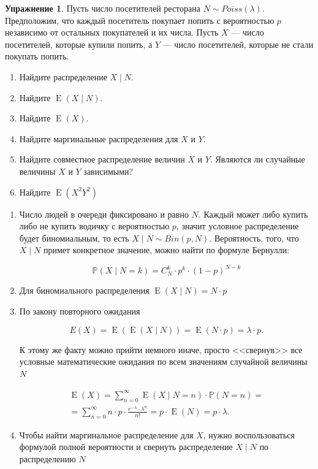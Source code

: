 \documentclass[12pt, a4paper, oneside]{extreport}
\DeclareMathOperator{\E}{\mathop{E}}
\def \mbb{\mathbb}
\def \PP{\mbb{P}}
\theoremstyle{plain}              %
\theoremstyle{definition}         %
\newtheorem{problem}{\color{myblue} Упражнение}
\begin{document}
\begin{problem}
Пусть число посетителей ресторана $N \sim Poiss(\lambda)$.  Предположим, что каждый посетитель покупает попить с вероятностью $p$ независимо от остальных покупателей и их числа. Пусть $X$ --- число посетителей, которые купили попить, а $Y$ --- число посетителей, которые не стали покупать попить.  

\begin{enumerate} 
\item Найдите распределение $X \mid N$.
\item Найдите $\E(X \mid N)$.
\item Найдите $\E(X)$.
\item Найдите маргинальные распределения для $X$ и $Y$.
\item Найдите совместное распределение величин $X$ и $Y$. Являются ли случайные величины $X$ и $Y$ зависимыми? 
\item Найдите $\E(X^2Y^2)$
\end{enumerate} 	

\begin{sol} 
\begin{enumerate}
	\item  Число людей в очереди фиксировано и равно $N$. Каждый может либо купить либо не купить водичку с вероятностью $p$, значит условное распределение будет биномиальным, то есть $X \mid N \sim Bin(p, N)$. Вероятность, того, что $X \mid N$ примет конкретное значение, можно найти по формуле Бернулли: 
	
	\[ \PP(X \mid N = k) = C_{N}^k \cdot p^k \cdot (1-p)^{N-k} \] 
	
	\item  Для биномиального распределения $\E(X \mid N) = N \cdot p$ 
	\item  По закону повторного ожидания 
	
	\[ E(X) = \E(\E(X \mid N)) = \E(N \cdot p) = \lambda \cdot p. \]
	
	К этому же факту можно прийти немного иначе, просто <<свернув>> все условные математические ожидания по всем значениям случайной величины $N$ 
	
	\begin{multline*}
	\E(X) = \sum_{n=0}^{\infty} \E(X \mid N =n) \cdot \PP(N = n) = \\ = \sum_{n=0}^{\infty} n\cdot p \cdot \frac{e^{-\lambda} \cdot \lambda^n}{n!} = p \cdot \E(N) = p \cdot \lambda.
	\end{multline*}
	
	\item Чтобы найти маргинальное распределение для $X$, нужно воспользоваться формулой полной вероятности и свернуть распределение $X  \mid  N$ по распределению $N$
	

\end{enumerate}
\end{sol}
\end{problem}
\end{document}
